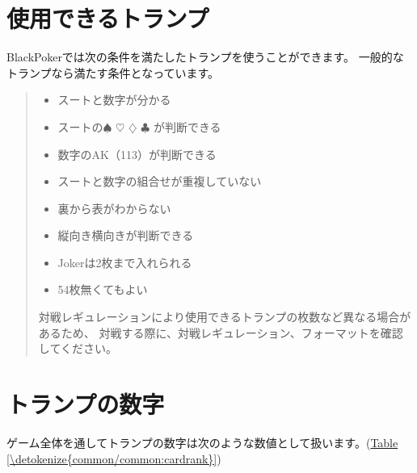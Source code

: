 \documentclass[letterpaper,10pt,dvipdfmx]{sphinxmanual}
\begin{document}
\section{使用できるトランプ}
\label{\detokenize{common/common:id4}}
\sphinxAtStartPar
BlackPokerでは次の条件を満たしたトランプを使うことができます。
一般的なトランプなら満たす条件となっています。
\begin{quote}
\begin{itemize}
\item {} 
\sphinxAtStartPar
スートと数字が分かる

\item {} 
\sphinxAtStartPar
スートの{\normalsize $\spadesuit$} {\normalsize $\heartsuit$} {\normalsize $\diamondsuit$} {\normalsize $\clubsuit$} が判断できる

\item {} 
\sphinxAtStartPar
数字のA\sphinxhyphen{}K（1\sphinxhyphen{}13）が判断できる

\item {} 
\sphinxAtStartPar
スートと数字の組合せが重複していない

\item {} 
\sphinxAtStartPar
裏から表がわからない

\item {} 
\sphinxAtStartPar
縦向き横向きが判断できる

\item {} 
\sphinxAtStartPar
Jokerは2枚まで入れられる

\item {} 
\sphinxAtStartPar
54枚無くてもよい

\end{itemize}

\sphinxAtStartPar
対戦レギュレーションにより使用できるトランプの枚数など異なる場合があるため、
対戦する際に、対戦レギュレーション、フォーマットを確認してください。
\end{quote}


\section{トランプの数字}
\label{\detokenize{common/common:id5}}
\sphinxAtStartPar
ゲーム全体を通してトランプの数字は次のような数値として扱います。(\hyperref[\detokenize{common/common:cardrank}]{Table \ref{\detokenize{common/common:cardrank}}})
\end{document}
